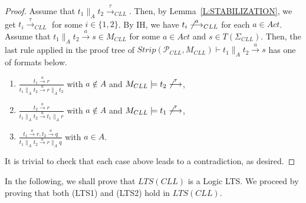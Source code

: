 \documentclass{elsarticle}
\theoremstyle{plain}
\theoremstyle{definition}
\begin{document}
\begin{proof}
        Assume that $t_1 \parallel_A t_2 \stackrel{\tau}{\longrightarrow}_{{CLL}}$.
         Then, by Lemma~\ref{L:STABILIZATION}, we get $t_i \stackrel{\tau}{\longrightarrow}_{CLL}$ for some $i\in \{1,2\}$.
         By IH, we have $t_i \not\stackrel{a}{\longrightarrow}_{CLL}$ for each $a \in Act$.
         Assume that $t_1 \parallel_A t_2 \stackrel{a}{\longrightarrow} s \in M_{{CLL}}$ for some $a\in Act$ and $s \in T(\Sigma_{CLL})$.
         Then, the last rule applied in the proof tree of $Strip({\mathcal P}_{CLL},M_{{CLL}}) \vdash t_1 \parallel_A t_2 \stackrel{a}{\longrightarrow}s $ has one of formats below.
         \begin{enumerate}
           \item $\frac{t_1 \stackrel{a}{\longrightarrow} r}{t_1 \parallel_A t_2 \stackrel{a}{\longrightarrow} r \parallel_A t_2}$ with $a\notin A$ and $M_{{CLL}} \models t_2 \not \stackrel{\tau}{\longrightarrow}$,
           \item $\frac{t_2 \stackrel{a}{\longrightarrow} r}{t_1 \parallel_A t_2 \stackrel{a}{\longrightarrow} t_1 \parallel_A r}$ with $a\notin A$ and $M_{{CLL}} \models t_1 \not \stackrel{\tau}{\longrightarrow}$,
           \item $\frac{t_1 \stackrel{a}{\longrightarrow} r,t_2 \stackrel{a}{\longrightarrow} q}{t_1 \parallel_A t_2 \stackrel{a}{\longrightarrow} r \parallel_A q }$ with $a\in A$.
         \end{enumerate}
        It is trivial to check that each case  above leads to a contradiction, as desired.
\end{proof}

In the following, we shall prove that $LTS(CLL)$ is a Logic LTS. We proceed by proving that both (LTS1) and (LTS2) hold in $LTS(CLL)$.
\end{document}
